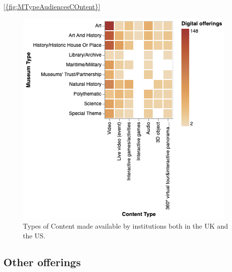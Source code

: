 \documentclass{egpubl}
\begin{document}
\ref{{fig:MTypeAudiencesCOntent}}
\begin{figure}[h]
  \centering
  \includegraphics[width=\linewidth]{images/typescontent.png}
  \caption{\label{fig:MTypeAudiencesCOntent}
            Types of Content made available by institutions both in the UK and the US.}
\end{figure}
\subsection{Other offerings }
\label{int}





\end{document}
